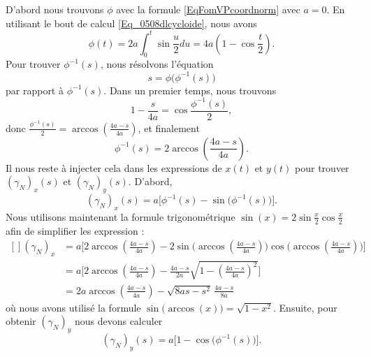 \begin{example}
    D'abord nous trouvons $\phi$ avec la formule \eqref{EqFomVPcoordnorm} avec $a=0$. En utilisant le bout de calcul \eqref{Eq_0508dlcycloide}, nous avons
    \begin{equation}
        \phi(t)=2a\int_0^t\sin\frac{ u }{2}du=4a\left( 1-\cos\frac{t}{2} \right).
    \end{equation}
    Pour trouver $\phi^{-1}(s)$, nous résolvons l'équation
    \begin{equation}
        s=\phi\big( \phi^{-1}(s) \big)
    \end{equation}
    par rapport à $\phi^{-1}(s)$. Dans un premier temps, nous trouvons
    \begin{equation}
        1-\frac{ s }{ 4a }=\cos\frac{ \phi^{-1}(s) }{ 2 },
    \end{equation}
    donc $\frac{ \phi^{-1}(s) }{2}=\arccos(\frac{ 4a-s }{ 4a })$, et finalement
    \begin{equation}
        \phi^{-1}(s)=2\arccos\left(\frac{ 4a-s }{ 4a }\right).
    \end{equation}
    Il nous reste à injecter cela dans les expressions de $x(t)$ et $y(t)$ pour trouver $(\gamma_N)_x(s)$ et $(\gamma_N)_y(s)$. D'abord,
    \begin{equation}
        (\gamma_N)_x(s)=a\big[ \phi^{-1}(s)-\sin\big( \phi^{-1}(s) \big) \big].
    \end{equation}
    Nous utilisons maintenant la formule trigonométrique $\sin(x)=2\sin\frac{ x }{ 2 }\cos\frac{ x }{2}$ afin de simplifier les expression :
    \begin{equation}
        \begin{aligned}[]
            (\gamma_N)_x&=a\Big[ 2\arccos\left( \frac{ 4a-s }{ 4a } \right)-2\sin\big( \arccos\left( \frac{ 4a-s }{ 4a } \right) \big)\cos\big( \arccos\left( \frac{ 4a-s }{ 4a } \right) \big) \Big]\\
            &=a\Big[ 2\arccos\left( \frac{ 4a-s }{ 4a } \right)-\frac{ 4a-s }{ 2a } \sqrt{1-\left( \frac{ 4a-s }{ 4a } \right)^2}\Big]\\
            &=2a\arccos\left( \frac{ 4a-s }{ 4a } \right)-\sqrt{8as-s^2}\,\frac{ 4a-s }{ 8a }
        \end{aligned}
    \end{equation}
    où nous avons utilisé la formule $\sin\big( \arccos(x) \big)=\sqrt{1-x^2}$. Ensuite, pour obtenir $(\gamma_N)_y$ nous devons calculer
    \begin{equation}
        (\gamma_N)_y(s)=a\big[ 1-\cos\big( \phi^{-1}(s) \big) \big].
    \end{equation}

\end{example}
